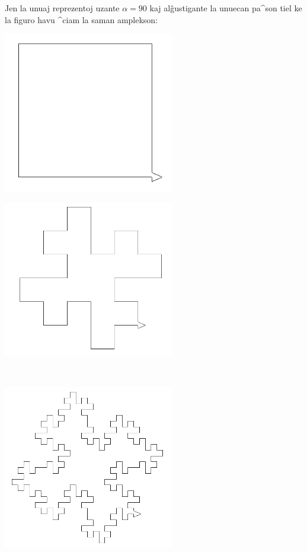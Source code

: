Jen la unuaj reprezentoj uzante $\alpha=90$ kaj alĝustigante la unuecan pa^son tiel ke
la figuro havu ^ciam la saman amplekson:
\begin{center}
\begin{minipage}{7.5cm}
 \includegraphics[width=7.5cm]{bildoj/linden-koch1.png}
\end{minipage}
\begin{minipage}{7.5cm}
 \includegraphics[width=7.5cm]{bildoj/linden-koch2.png}
\end{minipage}\\
\begin{minipage}{7.5cm}
 \includegraphics[width=7.5cm]{bildoj/linden-koch3.png}

\end{minipage}
\end{center}
